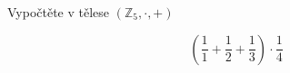 \subsubsection{}
Vypočtěte v tělese $(\mathbb{Z}_{5}, \cdot ,+)$

$$(\frac{1}{1}+\frac{1}{2}+\frac{1}{3})\cdot \frac{1}{4}$$
